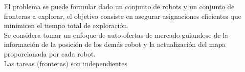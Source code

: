 \documentclass[12pt]{article}
\begin{document}
El problema se puede formular dado un conjunto de robots y un conjunto de fronteras a explorar, el objetivo consiste en asegurar asignaciones eficientes que minimicen el tiempo total de exploración.\\

Se considera tomar un enfoque de auto-ofertas de mercado guiandose de la información de la posición de los demás robot y la actualización del mapa proporcionada por cada robot.\\

Las tareas (fronteras) son independientes 
\end{document}
